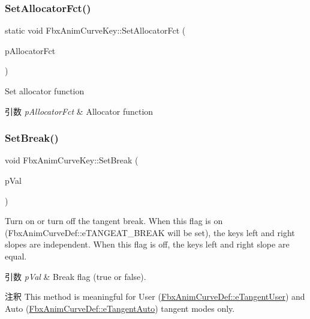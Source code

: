 \subsubsection{\texorpdfstring{Set\+Allocator\+Fct()}{SetAllocatorFct()}}
{\footnotesize\ttfamily static void Fbx\+Anim\+Curve\+Key\+::\+Set\+Allocator\+Fct (\begin{DoxyParamCaption}\item[{\hyperlink{class_fbx_anim_curve_key___impl}{Fbx\+Anim\+Curve\+Key\+\_\+\+Impl} $\ast$($\ast$)()}]{p\+Allocator\+Fct }\end{DoxyParamCaption})\hspace{0.3cm}{\ttfamily [static]}}

Set allocator function 
\begin{DoxyParams}{引数}
{\em p\+Allocator\+Fct} & Allocator function \\
\hline
\end{DoxyParams}
\mbox{\label{class_fbx_anim_curve_key_a688bc80bc9b18052f8bc078293fba426}} 
\subsubsection{\texorpdfstring{Set\+Break()}{SetBreak()}}
{\footnotesize\ttfamily void Fbx\+Anim\+Curve\+Key\+::\+Set\+Break (\begin{DoxyParamCaption}\item[{bool}]{p\+Val }\end{DoxyParamCaption})\hspace{0.3cm}{\ttfamily [inline]}}

Turn on or turn off the tangent break. When this flag is on (Fbx\+Anim\+Curve\+Def\+::e\+T\+A\+N\+G\+E\+A\+T\+\_\+\+B\+R\+E\+AK will be set), the key\textquotesingle{}s left and right slopes are independent. When this flag is off, the key\textquotesingle{}s left and right slope are equal. 
\begin{DoxyParams}{引数}
{\em p\+Val} & Break flag ({\ttfamily true} or {\ttfamily false}). \\
\hline
\end{DoxyParams}
\begin{DoxyRemark}{注釈}
This method is meaningful for User (\hyperlink{class_fbx_anim_curve_def_ac810ccc5ca0527704ab5175479964b87a199cb16b2c861b12c334093ce796cb86}{Fbx\+Anim\+Curve\+Def\+::e\+Tangent\+User}) and Auto (\hyperlink{class_fbx_anim_curve_def_ac810ccc5ca0527704ab5175479964b87a56e3bad364851277281e94e81327dd25}{Fbx\+Anim\+Curve\+Def\+::e\+Tangent\+Auto}) tangent modes only. 
\end{DoxyRemark}


